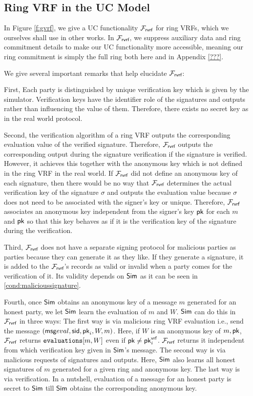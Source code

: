 \subsection{Ring VRF in the UC Model}

In Figure \ref{f:gvrf}, we give a UC functionality $\mathcal{F}_{\textsf{rvrf}}$ for ring VRFs,
which we ourselves shall use in other works.  In $\mathcal{F}_{\textsf{rvrf}}$, we suppress
auxiliary data and ring commitment details to make our UC functionality
more accessible, meaning our ring commitment is simply the full ring both
here and in Appendix \ref{???}.

We give several important remarks that help elucidate $\mathcal{F}_{\textsf{rvrf}}$:

First, Each party is distinguished by unique verification key which is given by the simulator. Verification keys have the identifier role of  the signatures and outputs rather than  influencing the value of them. Therefore, there exists no secret key as in the real world protocol.

Second, the verification algorithm of a ring VRF outputs the corresponding evaluation value of the verified signature. Therefore, $ \mathcal{F}_{\textsf{rvrf}} $  outputs the corresponding output during the signature verification if the signature is verified. However, it achieves this together with the anonymous key which is not defined in the ring VRF in the real world.  If $ \mathcal{F}_{\textsf{rvrf}} $ did not define an anonymous key of each signature, then there would be no way that $ \mathcal{F}_{\textsf{rvrf}} $ determines the actual verification key of the signature $ \sigma $ and outputs the evaluation value because $ \sigma $ does not need to be associated with the signer's key or unique. Therefore, $ \mathcal{F}_{\textsf{rvrf}} $ associates an anonymous key independent from the signer's key $ \mathsf{pk} $ for each $ m $ and $ \mathsf{pk} $ so that this key behaves as if it is the verification key of the signature during the verification.
	
Third, $ \mathcal{F}_{\textsf{rvrf}} $ does not have a separate signing protocol for malicious parties as parties because they can generate it as they like. If they generate a signature, it is added to the $ \mathcal{F}_{\textsf{rvrf}} $'s records as valid or invalid when a party comes for the verification of it.  Its validity depends on $ \mathsf{Sim} $ as it can be seen in \ref{cond:malicioussignature}. 
	
Fourth, once $ \mathsf{Sim} $ obtains an anonymous key of a message $ m $ generated for an honest party, we let $ \mathsf{Sim} $ learn the  evaluation of  $ m $ and  $ W $. $ \mathsf{Sim} $ can do this in $ \mathcal{F}_{\textsf{rvrf}} $ in three ways: The first way is via malicious ring VRF evaluation i.e., send the message $ (\mathsf{msg}{eval}, \textsf{sid}, \mathsf{pk}_i,W,m) $. Here, if $ W $ is an anonymous key of $ m, \mathsf{pk}  $, $ \mathcal{F}_{\textsf{rvrf}} $ returns $ \texttt{evaluations}[m, W] $ even if $ \mathsf{pk} \neq \mathsf{pk}^{\mathsf{vrf}}_i $. $ \mathcal{F}_{\textsf{rvrf}} $ returns it independent from which verification key given in $ \mathsf{Sim} $'s message. The second way is via malicious requests of signatures and outputs.  Here, $ \mathsf{Sim} $ also learns  all honest signatures of $ m $ generated for a given ring and anonymous key. The last way is via verification.  In a nutshell, evaluation of a message for an honest party is secret to $ \mathsf{Sim} $ till $ \mathsf{Sim} $ obtains the corresponding anonymous key.
	
